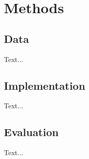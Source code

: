 \documentclass{kththesis}
\begin{document}
\chapter{Methods}

\section{Data}
Text...

\section{Implementation}
Text...

\section{Evaluation}
Text...

\printbibliography

\end{document}
